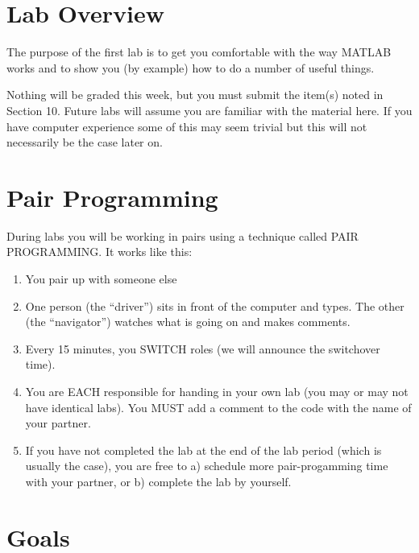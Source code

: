 \documentclass[letterpaper]{article}
\begin{document}
\section {Lab Overview}
The purpose of the first lab is to get you comfortable with the way MATLAB works and to show
you (by example) how to do a number of useful things.  

Nothing will be graded this week, but you must submit the item(s) noted in Section 10.  Future labs will assume you are familiar with
the material here. If you have computer experience some of this may seem
trivial but this will not necessarily be the case later on.  

\section{Pair Programming}
During labs you will be working in pairs using a technique called PAIR PROGRAMMING. It works like this:
\begin{enumerate}
\item You pair up with someone else 
\item One person (the ``driver'') sits in front of the computer and types. The other (the
``navigator'') watches what is
going on and makes comments.
\item Every 15 minutes, you SWITCH roles (we will announce the switchover time).
\item You are EACH responsible for handing in your own lab (you may or may not have identical labs). You MUST
add a comment to the code with the name of your partner.
\item If you have not completed the lab at the end of the lab period (which is usually the case),
you are free to a) schedule more pair-progamming time with your partner, or b) complete the lab
by yourself.
\end{enumerate}


\section {Goals}
\end{document}
